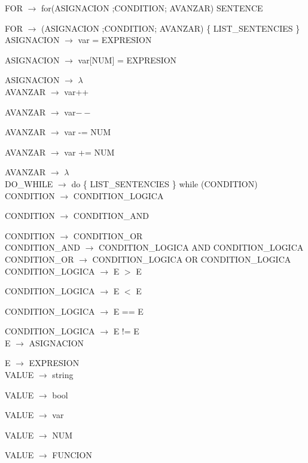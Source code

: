 \documentclass[10pt,a4paper]{article}
\begin{document}
FOR $\rightarrow$ for(ASIGNACION ;CONDITION; AVANZAR) SENTENCE  

FOR $\rightarrow$ (ASIGNACION ;CONDITION; AVANZAR) \{ LIST\_SENTENCIES \} \\

ASIGNACION $\rightarrow$ var = EXPRESION  

ASIGNACION $\rightarrow$ var[NUM] = EXPRESION  

ASIGNACION $\rightarrow$ $\lambda$ \\

AVANZAR $\rightarrow$ var++   

AVANZAR $\rightarrow$ var$--$   

AVANZAR $\rightarrow$ var -= NUM   

AVANZAR $\rightarrow$ var += NUM  

AVANZAR $\rightarrow$ $\lambda$ \\

DO\_WHILE $\rightarrow$ do \{ LIST\_SENTENCIES \} while (CONDITION) \\

CONDITION $\rightarrow$ CONDITION\_LOGICA   

CONDITION $\rightarrow$ CONDITION\_AND   

CONDITION $\rightarrow$ CONDITION\_OR \\

CONDITION\_AND $\rightarrow$ CONDITION\_LOGICA AND CONDITION\_LOGICA \\

CONDITION\_OR $\rightarrow$ CONDITION\_LOGICA OR CONDITION\_LOGICA \\

CONDITION\_LOGICA $\rightarrow$ E $>$ E   

CONDITION\_LOGICA $\rightarrow$ E $<$ E   

CONDITION\_LOGICA $\rightarrow$ E == E   

CONDITION\_LOGICA $\rightarrow$ E != E \\

E $\rightarrow$ ASIGNACION   

E $\rightarrow$ EXPRESION \\

VALUE $\rightarrow$ string   

VALUE $\rightarrow$ bool   

VALUE $\rightarrow$ var   

VALUE $\rightarrow$ NUM   

VALUE $\rightarrow$ FUNCION   
\end{document}
